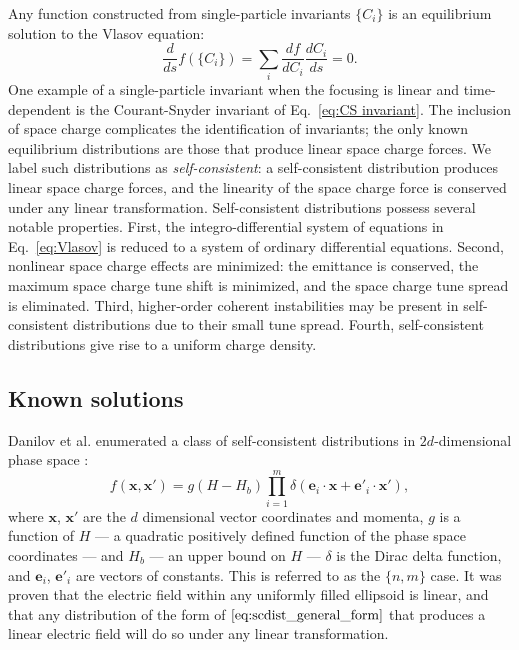 Any function constructed from single-particle invariants $\{C_i\}$ is an equilibrium solution to the Vlasov equation:
%
\begin{equation}\label{eq:vlasov_equilibria}
    \frac{d}{ds} f(\{C_i\}) = \sum_{i}{\frac{df}{dC_i}\frac{dC_i}{ds}} = 0.
\end{equation}
%
One example of a single-particle invariant when the focusing is linear and time-dependent is the Courant-Snyder invariant of Eq.~\eqref{eq:CS invariant}. The inclusion of space charge complicates the identification of invariants; the only known equilibrium distributions are those that produce linear space charge forces. We label such distributions as \textit{self-consistent}: a self-consistent distribution produces linear space charge forces, and the linearity of the space charge force is conserved under any linear transformation. 
Self-consistent distributions possess several notable properties. First, the integro-differential system of equations in Eq.~\eqref{eq:Vlasov} is reduced to a system of ordinary differential equations. Second, nonlinear space charge effects are minimized: the emittance is conserved, the maximum space charge tune shift is minimized, and the space charge tune spread is eliminated. Third, higher-order coherent instabilities may be present in self-consistent distributions due to their small tune spread. Fourth, self-consistent distributions give rise to a uniform charge density.



\subsection{Known solutions}

Danilov et al. enumerated a class of self-consistent distributions in $2d$-dimensional phase space \cite{Danilov2003}: 
%
\begin{equation}\label{eq:scdist_general_form}
    f\left({\mathbf{x}, \mathbf{x}'}\right) = 
    g\left({H - H_b}\right)
    \prod_{i=1}^{m}\delta\left({\mathbf{e}_i \cdot \mathbf{x} 
    + \mathbf{e}'_i \cdot \mathbf{x}'}\right),
\end{equation}
%
where $\mathbf{x}$, $\mathbf{x}'$ are the $d$ dimensional vector coordinates and momenta, $g$ is a function of $H$ — a quadratic positively defined function of the phase space coordinates — and $H_b$ — an upper bound on $H$ — $\delta$ is the Dirac delta function, and $\mathbf{e}_i$, $\mathbf{e}'_i$ are vectors of constants. This is referred to as the $\{n,m\}$ case. It was proven that the electric field within any uniformly filled ellipsoid is linear, and that any distribution of the form of $\eqref{eq:scdist_general_form}$ that produces a linear electric field will do so under any linear transformation.


